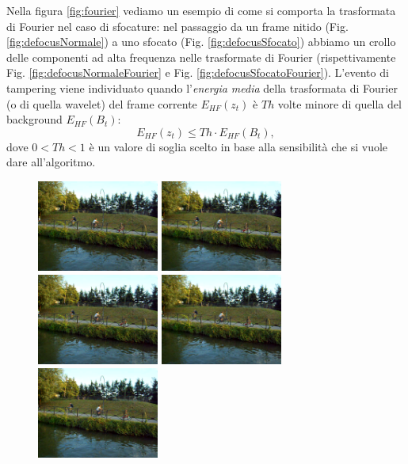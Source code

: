 Nella figura \ref{fig:fourier} vediamo un esempio di come si comporta la trasformata di Fourier nel caso di sfocature: 
nel passaggio da un frame nitido (Fig. \ref{fig:defocusNormale}) a uno sfocato (Fig. \ref{fig:defocusSfocato}) abbiamo un crollo delle componenti ad alta frequenza nelle trasformate di Fourier (rispettivamente Fig. \ref{fig:defocusNormaleFourier} e Fig. \ref{fig:defocusSfocatoFourier}).
L'evento di tampering viene individuato quando l'\textit{energia media} della trasformata di Fourier (o di quella wavelet) del frame corrente $E_{HF}(z_t)$ \`e $Th$ volte minore di quella del background $E_{HF}(B_t)$:
\[E_{HF}(z_t)\leq Th \cdot E_{HF}(B_t),\]
dove $0<Th<1$ \`e  un valore di soglia scelto in base alla sensibilit\`a che si vuole dare all'algoritmo.\\
\begin{figure}[tb]
	\centering
	\includegraphics[width = 4cm]{./pictures/FPSalto/img0001}
	\includegraphics[width = 4cm]{./pictures/FPSalto/img0002}
	\includegraphics[width = 4cm]{./pictures/FPSalto/img0003}
	\includegraphics[width = 4cm]{./pictures/FPSalto/img0004}
	\includegraphics[width = 4cm]{./pictures/FPSalto/img0005}

\end{figure}
